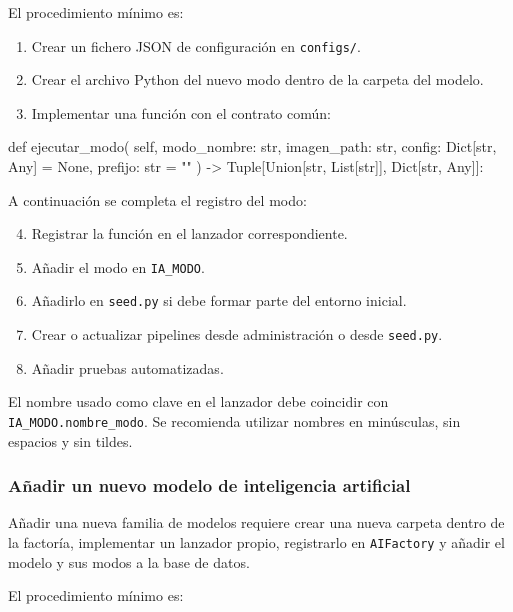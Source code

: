 El procedimiento mínimo es:

\begin{enumerate}
	\item Crear un fichero JSON de configuración en \texttt{configs/}.
	\item Crear el archivo Python del nuevo modo dentro de la carpeta del modelo.
	\item Implementar una función con el contrato común:
\end{enumerate}

\begin{bloqueCodigo}[title={Contrato de un nuevo modo}]
	def ejecutar_modo(
			self,
			modo_nombre: str,
			imagen_path: str,
			config: Dict[str, Any] = None,
			prefijo: str = ""
	) -> Tuple[Union[str, List[str]], Dict[str, Any]]:
\end{bloqueCodigo}

A continuación se completa el registro del modo:

\begin{enumerate}
	\setcounter{enumi}{3}
	\item Registrar la función en el lanzador correspondiente.
	\item Añadir el modo en \texttt{IA\_MODO}.
	\item Añadirlo en \texttt{seed.py} si debe formar parte del entorno inicial.
	\item Crear o actualizar pipelines desde administración o desde \texttt{seed.py}.
	\item Añadir pruebas automatizadas.
\end{enumerate}

El nombre usado como clave en el lanzador debe coincidir con \texttt{IA\_MODO.nombre\_modo}. Se recomienda utilizar nombres en minúsculas, sin espacios y sin tildes.

\subsubsection{Añadir un nuevo modelo de inteligencia artificial}

Añadir una nueva familia de modelos requiere crear una nueva carpeta dentro de la factoría, implementar un lanzador propio, registrarlo en \texttt{AIFactory} y añadir el modelo y sus modos a la base de datos.

El procedimiento mínimo es:

